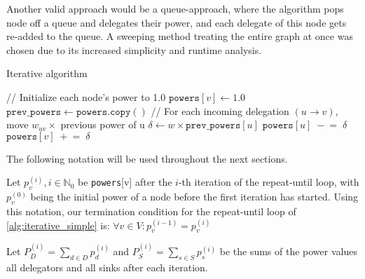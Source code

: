 
Another valid approach would be a queue-approach, where the algorithm pops node off a queue and delegates their power, and each delegate of this node gets re-added to the queue. A sweeping method treating the entire graph at once was chosen due to its increased simplicity and runtime analysis.

\begin{algorithm} [t]
 \caption{Iterative algorithm}\label{alg:iterative_simple}
\begin{algorithmic}[1]
\State // Initialize each node’s power to 1.0  
    \State \(\texttt{powers}[v] \gets 1.0\)
\EndFor
\Repeat
    \State \(\texttt{prev\_powers} \gets \texttt{powers}.\texttt{copy}()\)  
        \State // For each incoming delegation \((u \to v)\), move \(w_{uv}\times\) previous power of u
            \State \(\delta \gets w \times \texttt{prev\_powers}[u]\) \label{alg:iterative_simple_delta_assignment}
            \State \(\texttt{powers}[u] \;-\!=\; \delta\) \label{alg:iterative_simple_remove_delta}
            \State \(\texttt{powers}[v] \;+\!=\; \delta\) \label{alg:iterative_simple_add_delta}
        \EndFor
    \EndFor
{} \label{alg:iterative_simple_termination_cond}
\end{algorithmic}
\end{algorithm}

The following notation will be used throughout the next sections.

Let $p_v^{(i)}, i \in \mathbb{N}_0$ be \texttt{powers}[v] after the $i$-th iteration of the repeat-until loop, with $p_v^{(0)}$ being the initial power of a node before the first iteration has started. Using this notation, our termination condition for the repeat-until loop of \cref{alg:iterative_simple} is: $\forall v \in V: p_v^{(i-1)} = p_v^{(i)}$

Let $P_D^{(i)} = \sum_{d \in D} p_d^{(i)}$ and $P_S^{(i)} = \sum_{s \in S} p_s^{(i)}$ be the sums of the power values all delegators and all sinks after each iteration.

